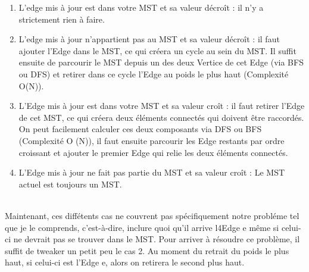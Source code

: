 \documentclass[11pt]{article}
\begin{document}
\begin{enumerate}
	\begin{enumerate}
	
	\item L’edge mis à jour est dans votre MST et sa valeur décroît : il n’y a strictement rien à faire.
	\item L’edge mis à jour n’appartient pas au MST et sa valeur décroît : il faut ajouter l’Edge dans le MST, ce qui créera un 		cycle au sein du MST. Il suffit ensuite de parcourir le MST depuis un des deux Vertice de cet Edge (via BFS ou DFS) et 			retirer dans ce cycle l’Edge au poids le plus haut (Complexité O(N)).
	\item L’Edge mis à jour est dans votre MST et sa valeur croît : il faut retirer  l’Edge de cet MST, ce qui créera deux 			éléments connectés qui doivent être raccordés. On peut facilement calculer ces deux composants via DFS ou BFS (Complexité O		(N)), il faut ensuite parcourir les Edge restants par ordre croissant et ajouter le premier Edge qui relie les deux 			éléments connectés.
	\item L’Edge mis à jour ne fait pas partie du MST et sa valeur croît : Le MST actuel est toujours un MST.
	
	\end{enumerate}
\\
Maintenant, ces diffétents cas ne couvrent pas spécifiquement notre probléme tel que je le comprends, c’est-à-dire, inclure quoi qu’il arrive l4Edge e même si celui-ci ne devrait pas se trouver dans le MST. Pour arriver à résoudre ce problème, il suffit de tweaker un petit peu le cas 2. Au moment du retrait du poids le plus haut, si celui-ci est l’Edge e, alors on retirera le second plus haut.



\end{enumerate}
\end{document}
